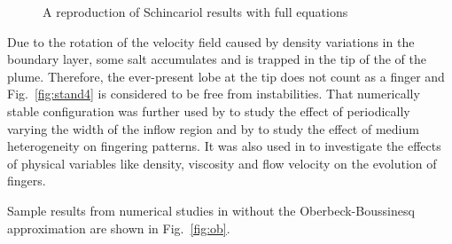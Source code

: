 \begin{figure}[!h]
\begin{center}
  \end{center}
  \addtolength{\abovecaptionskip}{-0.45cm}\caption{\label{fig:stand} A reproduction of Schincariol results with full equations}
 \end{figure}

Due to the rotation of the velocity field caused by density variations in the boundary layer,  some salt accumulates and is trapped in the tip of the of the plume. Therefore, the ever-present lobe at the tip does not count as a finger and Fig.\ \ref {fig:stand4} is considered to be free from instabilities. That numerically stable configuration was further used by \cite{schinca1} to study the effect of periodically varying the width of the inflow region and by \cite{schinca2} to study the effect of medium heterogeneity on fingering patterns. It was also used in \cite{musu} to investigate the effects of physical variables like density, viscosity and flow velocity on the evolution of fingers. 

Sample results from numerical studies in \cite{musu} without the Oberbeck-Boussinesq approximation are shown in Fig.\ \ref{fig:ob}.


